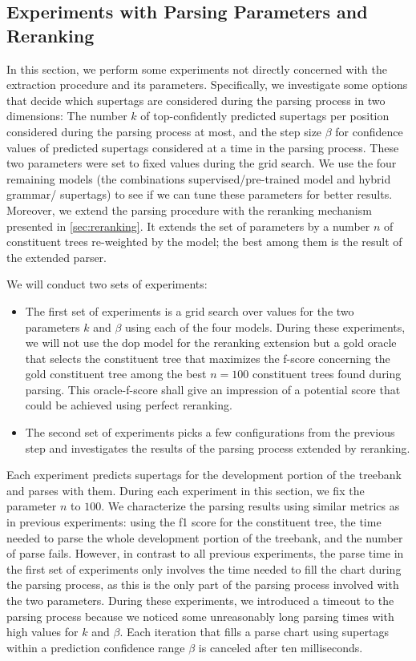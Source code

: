 \documentclass[../../document.tex]{subfiles}
\begin{document}
    \subsection{Experiments with Parsing Parameters and Reranking}\label{sec:gridsearch:reranking}
    In this section, we perform some experiments not directly concerned with the extraction procedure and its parameters.
    Specifically, we investigate some options that decide which supertags are considered during the parsing process in two dimensions:
        The number \(k\) of top-confidently predicted supertags per position considered during the parsing process at most, and the step size \(\beta\) for confidence values of predicted supertags considered at a time in the parsing process.
    These two parameters were set to fixed values during the grid search. We use the four remaining models (the combinations supervised/pre-trained model and hybrid grammar/ supertags) to see if we can tune these parameters for better results.
    Moreover, we extend the parsing procedure with the reranking mechanism presented in \cref{sec:reranking}.
    It extends the set of parameters by a number \(n\) of constituent trees re-weighted by the  model; the best among them is the result of the extended parser.

    We will conduct two sets of experiments:
    \begin{itemize}
        \item The first set of experiments is a grid search over values for the two parameters \(k\) and \(\beta\) using each of the four models. During these experiments, we will not use the dop model for the reranking extension but a gold oracle that selects the constituent tree that maximizes the f-score concerning the gold constituent tree among the best \(n = 100\) constituent trees found during parsing. This oracle-f-score shall give an impression of a potential score that could be achieved using perfect reranking.
        \item The second set of experiments picks a few configurations from the previous step and investigates the results of the parsing process extended by reranking.
    \end{itemize}
    Each experiment predicts supertags for the development portion of the treebank and parses with them.
    During each experiment in this section, we fix the parameter \(n\) to \(100\).
    We characterize the parsing results using similar metrics as in previous experiments: using the f1 score for the constituent tree, the time needed to parse the whole development portion of the treebank, and the number of parse fails.
    However, in contrast to all previous experiments, the parse time in the first set of experiments only involves the time needed to fill the chart during the parsing process, as this is the only part of the parsing process involved with the two parameters.
    During these experiments, we introduced a timeout to the parsing process because we noticed some unreasonably long parsing times with high values for \(k\) and \(\beta\). Each iteration that fills a parse chart using supertags within a prediction confidence range \(\beta\) is canceled after ten milliseconds.
\end{document}
